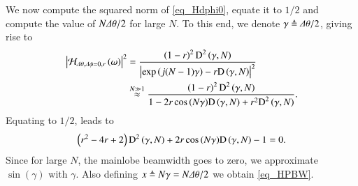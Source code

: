 We now compute the squared norm of \eqref{eq_Hdphi0}, equate it to $1/2$ and compute the value of $N\dTheta/2$ for large $N$. To this end, we denote $\gamma\triangleq\dTheta/2$, giving rise to
\begin{equation*}
    {
        \begin{split}
            \abs{\Hr_{\dTheta,\dPhi=0,r}\rBrace{\omega}}^{2}&=
             \frac{\rBrace{1-r}^{2}\Dp{\gamma,N}{2}}{\abs{\exp\rBrace{j(N-1)\gamma}-r\D{\gamma}{N}}^{2}}
             \\&
             \overset{N\gg1}{\approx}\frac{\rBrace{1-r}^{2}\Dp{\gamma,N}{2}}{1-2r\cos{\rBrace{N\gamma}}\D{\gamma}{N}+r^{2}\Dp{\gamma,N}{2}}.
        \end{split}
    }
\end{equation*}
Equating to $1/2$, leads to
\begin{equation*}
        \begin{split}
            \rBrace{r^{2}-4r+2}\Dp{\gamma,N}{2}+2r\cos{\rBrace{N\gamma}}\D{\gamma}{N}-1 = 0.
        \end{split}
\end{equation*}
Since for large $N$, the mainlobe beamwidth goes to zero, we approximate $\sin(\gamma)$ with $\gamma$. Also defining $x\triangleq{}N\gamma=N\dTheta/2$ we obtain \eqref{eq_HPBW}.